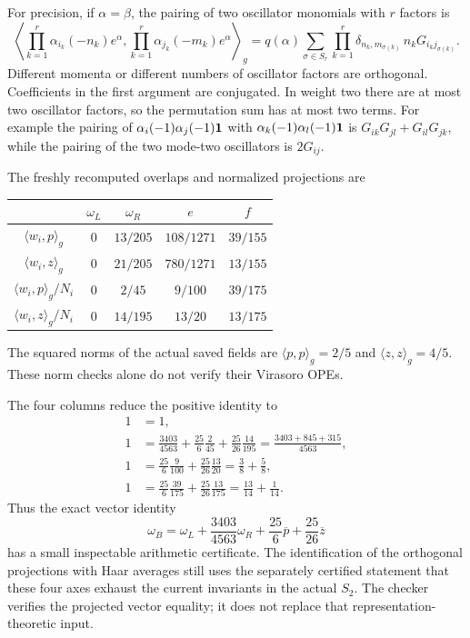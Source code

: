 For precision, if $\alpha=\beta$, the pairing of two oscillator
monomials with $r$ factors is
\[
\left\langle\prod_{k=1}^r\alpha_{i_k}(-n_k)e^\alpha,
\prod_{k=1}^r\alpha_{j_k}(-m_k)e^\alpha\right\rangle_g
=q(\alpha)\sum_{\sigma\in S_r}
\prod_{k=1}^r\delta_{n_k,m_{\sigma(k)}}\,n_kG_{i_kj_{\sigma(k)}}.
\]
Different momenta or different numbers of oscillator factors are
orthogonal. Coefficients in the first argument are conjugated. In
weight two there are at most two oscillator factors, so the permutation
sum has at most two terms. For example the pairing of
$\alpha_i(-1)\alpha_j(-1)\mathbf1$ with
$\alpha_k(-1)\alpha_l(-1)\mathbf1$ is
$G_{ik}G_{jl}+G_{il}G_{jk}$, while the pairing of the two mode-two
oscillators is $2G_{ij}$.

The freshly recomputed overlaps and normalized projections are
\begin{center}
\begin{tabular}{@{}ccccc@{}}\toprule
 & $\omega_L$ & $\omega_R$ & $e$ & $f$\\\midrule
$\langle w_i,p\rangle_g$ & $0$ & $13/205$ & $108/1271$ & $39/155$\\
$\langle w_i,z\rangle_g$ & $0$ & $21/205$ & $780/1271$ & $13/155$\\\midrule
$\langle w_i,p\rangle_g/N_i$ & $0$ & $2/45$ & $9/100$ & $39/175$\\
$\langle w_i,z\rangle_g/N_i$ & $0$ & $14/195$ & $13/20$ & $13/175$\\\bottomrule
\end{tabular}\end{center}
The squared norms of the actual saved fields are
$\langle p,p\rangle_g=2/5$ and $\langle z,z\rangle_g=4/5$.
These norm checks alone do not verify their Virasoro OPEs.

The four columns reduce the positive identity to
\[
\begin{split}
1&=1,\\
1&=\frac{3403}{4563}+\frac{25}{6}\frac{2}{45}
                         +\frac{25}{26}\frac{14}{195}
   =\frac{3403+845+315}{4563},\\
1&=\frac{25}{6}\frac9{100}+\frac{25}{26}\frac{13}{20}
   =\frac38+\frac58,\\
1&=\frac{25}{6}\frac{39}{175}+\frac{25}{26}\frac{13}{175}
   =\frac{13}{14}+\frac1{14}.
\end{split}
\]
Thus the exact vector identity
\[
\omega_B=\omega_L+\frac{3403}{4563}\omega_R
                      +\frac{25}{6}\overline p+\frac{25}{26}\overline z
\]
has a small inspectable arithmetic certificate. The identification of
the orthogonal projections with Haar averages still uses the separately
certified statement that these four axes exhaust the current invariants
in the actual $S_2$. The checker verifies the projected vector equality;
it does not replace that representation-theoretic input.

